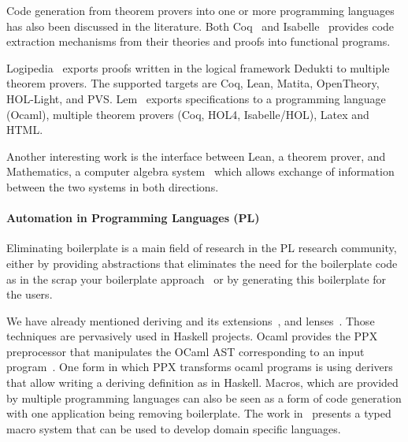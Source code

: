 Code generation from theorem provers into one or more programming languages has also been discussed in the literature. Both Coq~\cite{CoqCodegen2003, cruz2003program} and Isabelle~\cite{IsabelleCodegen2010} provides code extraction mechanisms from their theories and proofs into functional programs. 

Logipedia~\cite{Dowek2019LogipediaAM} exports proofs written in the logical framework Dedukti to multiple theorem provers. The supported targets are Coq, Lean, Matita, OpenTheory, HOL-Light, and PVS. 
Lem~\cite{lem2014} exports specifications to a programming language (Ocaml), multiple theorem provers (Coq, HOL4, Isabelle/HOL), Latex and HTML. 

Another interesting work is the interface between Lean, a theorem prover, and Mathematics, a computer algebra system~\cite{Lewis_2017} which allows exchange of information between the two systems in both directions.  



\paragraph{Automation in Programming Languages (PL)}
Eliminating boilerplate is a main field of research in the PL research community, either by providing abstractions that eliminates the need for the boilerplate code as in the scrap your boilerplate approach~\cite{syb2003Jones} or by generating this boilerplate for the users.  

We have already mentioned deriving and its extensions~\cite{loeh2010genericDeriving, loeh2018derivingVia}, and lenses~\cite{lensesLib}. Those techniques are pervasively used in Haskell projects.
Ocaml provides the PPX preprocessor that manipulates the OCaml AST corresponding to an input program~\cite{ocaml2019ppx}. One form in which PPX transforms ocaml programs is using derivers that allow writing a deriving definition as in Haskell. 
Macros, which are provided by multiple programming languages can also be seen as a form of code generation with one application being removing boilerplate. The work in~\cite{macros2001msp} presents a typed macro system that can be used to develop domain specific languages. 


